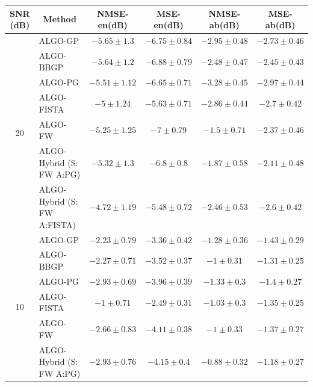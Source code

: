 \begin{table}[h]
\centering
\begin{adjustbox}{max width=\textwidth}
\begin{tabular}{|c|l|c|c|c|c|}
\hline
SNR (dB)            & \multicolumn{1}{c|}{Method}       & NMSE-en(dB)         & MSE-en(dB)          & NMSE-ab(dB)         & MSE-ab(dB)          \tabularnewline \hline
\multirow{7}{*}{20} & ALGO-GP                    & $-5.65    \pm 1.3$  & $-6.75    \pm 0.84$ & $-2.95    \pm 0.48$ & $-2.73    \pm 0.46$ \tabularnewline
                    & ALGO-BBGP                  & $-5.64    \pm 1.2$  & $-6.88    \pm 0.79$ & $-2.48    \pm 0.47$ & $-2.45    \pm 0.43$ \tabularnewline
                    & ALGO-PG                    & $-5.51    \pm 1.12$ & $-6.65    \pm 0.71$ & $-3.28    \pm 0.45$ & $-2.97    \pm 0.44$ \tabularnewline
                    & ALGO-FISTA                 & $-5       \pm 1.24$ & $-5.63    \pm 0.71$ & $-2.86    \pm 0.44$ & $-2.7     \pm 0.42$ \tabularnewline
                    & ALGO-FW                    & $-5.25    \pm 1.25$ & $-7       \pm 0.79$ & $-1.5     \pm 0.71$ & $-2.37    \pm 0.46$ \tabularnewline
                    & ALGO-Hybrid (S: FW A:PG)   & $-5.32    \pm 1.3$  & $-6.8     \pm 0.8$  & $-1.87    \pm 0.58$ & $-2.11    \pm 0.48$ \tabularnewline
                    & ALGO-Hybrid (S: FW A:FISTA)& $-4.72    \pm 1.19$ & $-5.48    \pm 0.72$ & $-2.46    \pm 0.53$ & $-2.6     \pm 0.42$ \tabularnewline \hline
\multirow{7}{*}{10} & ALGO-GP                    & $-2.23    \pm 0.79$ & $-3.36    \pm 0.42$ & $-1.28    \pm 0.36$ & $-1.43    \pm 0.29$ \tabularnewline
                    & ALGO-BBGP                  & $-2.27    \pm 0.71$ & $-3.52    \pm 0.37$ & $-1       \pm 0.31$ & $-1.31    \pm 0.25$ \tabularnewline
                    & ALGO-PG                    & $-2.93    \pm 0.69$ & $-3.96    \pm 0.39$ & $-1.33    \pm 0.3$  & $-1.4     \pm 0.27$ \tabularnewline
                    & ALGO-FISTA                 & $-1       \pm 0.71$ & $-2.49    \pm 0.31$ & $-1.03    \pm 0.3$  & $-1.35    \pm 0.25$ \tabularnewline
                    & ALGO-FW                    & $-2.66    \pm 0.83$ & $-4.11    \pm 0.38$ & $-1       \pm 0.33$ & $-1.37    \pm 0.27$ \tabularnewline
                    & ALGO-Hybrid (S: FW A:PG)   & $-2.93    \pm 0.76$ & $-4.15    \pm 0.4$  & $-0.88    \pm 0.32$ & $-1.18    \pm 0.27$ \tabularnewline

\end{tabular}
\end{adjustbox}
\end{table}
